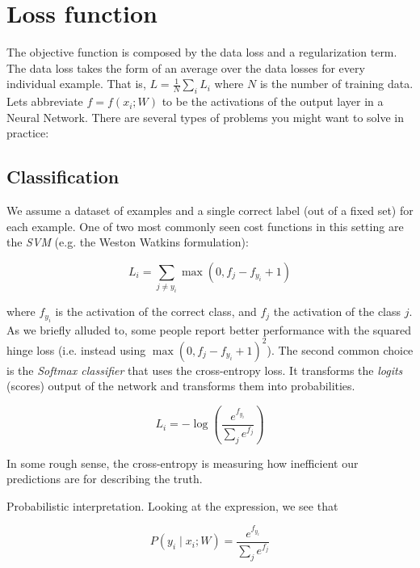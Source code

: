 \chapter{Loss function}

The objective function is composed by the data loss and a regularization term. The data loss takes the form of an average over the data losses for every individual example. That is, $L = \frac{1}{N} \sum_i L_i$ where $N$ is the number of training data. Lets abbreviate $f = f(x_i; W)$ to be the activations of the output layer in a Neural Network. There are several types of problems you might want to solve in practice:

\section*{Classification}

We assume a dataset of examples and a single correct label (out of a fixed set) for each example. One of two most commonly seen cost functions in this setting are the \textit{SVM} (e.g. the Weston Watkins formulation):

\begin{equation}
L_i = \sum_{j\neq y_i} \max(0, f_j - f_{y_i} + 1)
\end{equation}

where $f_{y_i}$ is the activation of the correct class, and $f_{j}$ the activation of the class $j$. As we briefly alluded to, some people report better performance with the squared hinge loss (i.e. instead using $\max(0, f_j - f_{y_i} + 1)^2$). The second common choice is the \textit{Softmax classifier} that uses the cross-entropy loss. It transforms the \textit{logits} (scores) output of the network and transforms them into probabilities.

\begin{equation}
L_i = -\log\left(\frac{e^{f_{y_i}}}{ \sum_j e^{f_j} }\right)
\end{equation}

In some rough sense, the cross-entropy is measuring how inefficient our predictions are for describing the truth. 

Probabilistic interpretation. Looking at the expression, we see that

\begin{equation}
P(y_i \mid x_i;W) = \frac{e^{f_{y_i}}}{ \sum_j e^{f_j} }
\end{equation}

